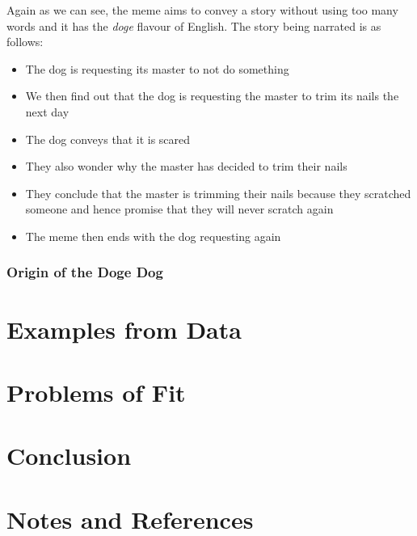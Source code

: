 \documentclass{article}
\begin{document}
Again as we can see, the meme aims to convey a story without using too many words and it has the \textit{doge} flavour of English. The story being narrated is as follows:
\begin{itemize}
    \item The dog is requesting its master to not do something
    \item We then find out that the dog is requesting the master to trim its nails the next day
    \item The dog conveys that it is scared
    \item They also wonder why the master has decided to trim their nails
    \item They conclude that the master is trimming their nails because they scratched someone and hence promise that they will never scratch again
    \item The meme then ends with the dog requesting again
\end{itemize}

\subsubsection{Origin of the Doge Dog}



\section{Examples from Data}

\section{Problems of Fit}

\section{Conclusion}

\section{Notes and References}
\end{document}
